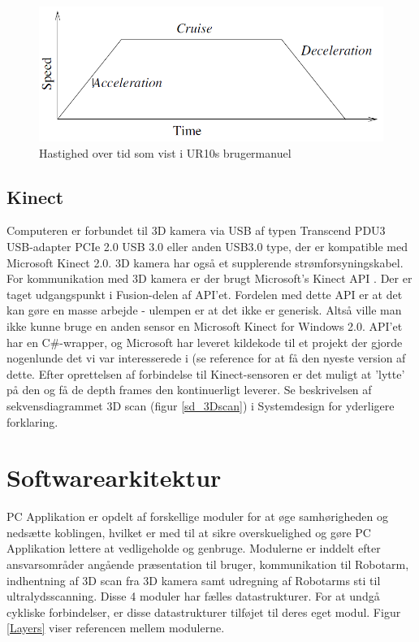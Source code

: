 \begin{figure}[H]
    \centering
    \includegraphics[width=1\textwidth]{figurer/d/movel_velocity}
    \caption{Hastighed over tid som vist i UR10s brugermanuel}
    \label{ur10velocity}
\end{figure}


\subsection{Kinect}
Computeren er forbundet til 3D kamera via USB af typen Transcend PDU3 USB-adapter PCIe 2.0 USB 3.0 eller anden USB3.0 type, der er kompatible med Microsoft Kinect 2.0. 3D kamera har også et supplerende strømforsyningskabel.
For kommunikation med 3D kamera er der brugt Microsoft's Kinect API \cite{KinectAPI} .
Der er taget udgangspunkt i Fusion-delen \cite{KinectFusion} af API'et. Fordelen med dette API er at det kan gøre en masse arbejde - ulempen er at det ikke er generisk. Altså ville man ikke kunne bruge en anden sensor en Microsoft Kinect for Windows 2.0. API'et har en C\#-wrapper, og Microsoft har leveret kildekode til et projekt der gjorde nogenlunde det vi var interesserede i (se reference \cite{KinectFusionExplorer} for at få den nyeste version af dette.
Efter oprettelsen af forbindelse til Kinect-sensoren er det muligt at 'lytte' på den og få de depth frames den kontinuerligt leverer. Se beskrivelsen af sekvensdiagrammet 3D scan (figur \ref{sd_3Dscan}) i Systemdesign for yderligere forklaring.

\newpage

\section{Softwarearkitektur}
PC Applikation er opdelt af forskellige moduler for at øge samhørigheden og nedsætte koblingen, hvilket er med til at sikre overskuelighed og gøre PC Applikation lettere at vedligeholde og genbruge. Modulerne er inddelt efter ansvarsområder angående præsentation til bruger, kommunikation til Robotarm, indhentning af 3D scan fra 3D kamera samt udregning af Robotarms sti til ultralydsscanning. Disse 4 moduler har fælles datastrukturer. For at undgå cykliske forbindelser, er disse datastrukturer tilføjet til deres eget modul. Figur \ref{Layers} viser referencen mellem modulerne. 

